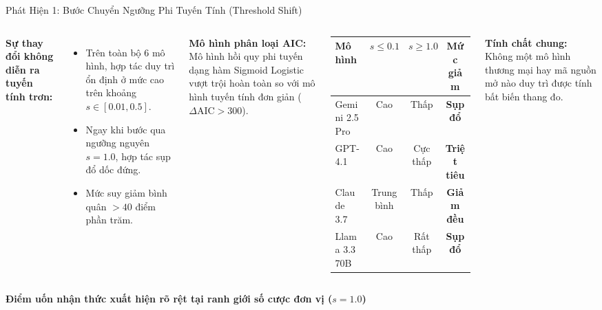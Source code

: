 \documentclass[aspectratio=169,9pt]{beamer}
\newcommand{\takeaway}[1]{%
  \par\vspace{\fill}%
  \noindent\begin{mdframed}[
    linecolor=maccent, linewidth=1.2pt,
    backgroundcolor=mlightgold,
    innertopmargin=3pt, innerbottommargin=3pt,
    innerleftmargin=8pt, innerrightmargin=8pt,
    roundcorner=3pt, skipabove=2pt, skipbelow=0pt
  ]
  \centering\footnotesize\bfseries\color{mprimary} #1
  \end{mdframed}\par%
}
\begin{document}
\begin{frame}{Phát Hiện 1: Bước Chuyển Ngưỡng Phi Tuyến Tính (Threshold Shift)}

\begin{columns}[T]

\vspace{0.2em}
\textbf{Sự thay đổi không diễn ra tuyến tính trơn:}
\begin{itemize}\setlength\itemsep{4pt}
  \item Trên toàn bộ 6 mô hình, hợp tác duy trì ổn định ở mức cao trên khoảng $s \in [0.01, 0.5]$.
  \item Ngay khi bước qua ngưỡng nguyên $s = 1.0$, hợp tác sụp đổ dốc đứng.
  \item Mức suy giảm bình quân $>40$ điểm phần trăm.
\end{itemize}

\vspace{0.4em}
\begin{primarybox}
\footnotesize \textbf{Mô hình phân loại AIC:}\\Mô hình hồi quy phi tuyến dạng hàm Sigmoid Logistic vượt trội hoàn toàn so với mô hình tuyến tính đơn giản ($\Delta\text{AIC} > 300$).
\end{primarybox}

\vspace{0.2em}

\centering
\begin{tabular}{@{}lccc@{}}
\toprule
\textbf{Mô hình} & \textbf{$s \le 0.1$} & \textbf{$s \ge 1.0$} & \textbf{Mức giảm} \\
\midrule
Gemini 2.5 Pro & Cao & Thấp & \textcolor{mbad}{\textbf{Sụp đổ}} \\
GPT-4.1        & Cao & Cực thấp & \textcolor{mbad}{\textbf{Triệt tiêu}} \\
Claude 3.7     & Trung bình & Thấp & \textcolor{mbad}{\textbf{Giảm đều}} \\
Llama 3.3 70B  & Cao & Rất thấp & \textcolor{mbad}{\textbf{Sụp đổ}} \\
\bottomrule
\end{tabular}

\vspace{0.5em}
\begin{goodbox}
\footnotesize \textbf{Tính chất chung:} Không một mô hình thương mại hay mã nguồn mở nào duy trì được tính bất biến thang đo.
\end{goodbox}

\end{columns}

\takeaway{Điểm uốn nhận thức xuất hiện rõ rệt tại ranh giới số cược đơn vị ($s=1.0$)}
\end{frame}
\end{document}
